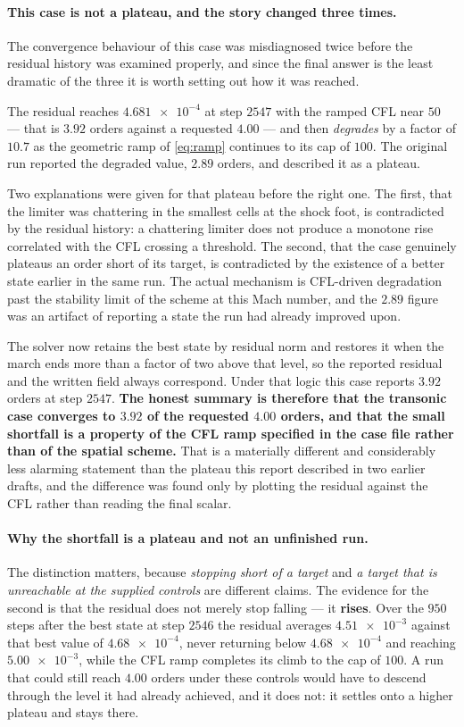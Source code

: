 \paragraph{This case is not a plateau, and the story changed three times.} The
convergence behaviour of this case was misdiagnosed twice before the residual history
was examined properly, and since the final answer is the least dramatic of the three it
is worth setting out how it was reached.

The residual reaches $\num{4.681e-4}$ at step $2547$ with the ramped CFL near $50$ ---
that is $3.92$ orders against a requested $4.00$ --- and then \emph{degrades} by a factor
of $10.7$ as the geometric ramp of \cref{eq:ramp} continues to its cap of $100$. The
original run reported the degraded value, $2.89$ orders, and described it as a plateau.

Two explanations were given for that plateau before the right one. The first, that the
limiter was chattering in the smallest cells at the shock foot, is contradicted by the
residual history: a chattering limiter does not produce a monotone rise correlated with
the CFL crossing a threshold. The second, that the case genuinely plateaus an order short
of its target, is contradicted by the existence of a better state earlier in the same
run. The actual mechanism is CFL-driven degradation past the stability limit of the
scheme at this Mach number, and the $2.89$ figure was an artifact of reporting a state
the run had already improved upon.

The solver now retains the best state by residual norm and restores it when the march
ends more than a factor of two above that level, so the reported residual and the written
field always correspond. Under that logic this case reports $3.92$ orders at step $2547$.
\textbf{The honest summary is therefore that the transonic case converges to $3.92$ of
the requested $4.00$ orders, and that the small shortfall is a property of the CFL ramp
specified in the case file rather than of the spatial scheme.} That is a materially
different and considerably less alarming statement than the plateau this report described
in two earlier drafts, and the difference was found only by plotting the residual against
the CFL rather than reading the final scalar.

\paragraph{Why the shortfall is a plateau and not an unfinished run.}
\label{sec:plateau}
The distinction
matters, because \emph{stopping short of a target} and \emph{a target that is unreachable
at the supplied controls} are different claims. The evidence for the second is that the
residual does not merely stop falling --- it \textbf{rises}. Over the $950$ steps after the
best state at step $2546$ the residual averages $\num{4.51e-3}$ against that best value of
$\num{4.68e-4}$, never returning below $\num{4.68e-4}$ and reaching $\num{5.00e-3}$, while
the CFL ramp completes its climb to the cap of $100$. A run that could still reach $4.00$
orders under these controls would have to descend through the level it had already
achieved, and it does not: it settles onto a higher plateau and stays there.

